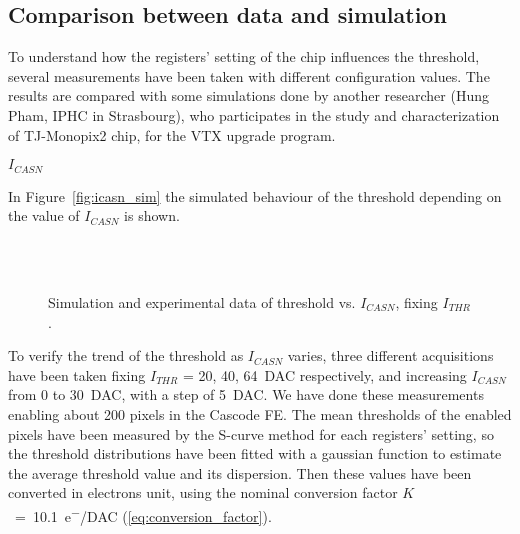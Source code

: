 \begin{comment}
\footnote{
\begin{equation}
I_{DISC} = I_{DISC, coarse} + (TCODE - 1) \cdot I_{DISC,fine},  \hspace{.5cm}	where \hspace{.5cm} 1 \leq TDAC \leq 7
\end{equation}
}
\end{comment}



\subsection{Comparison between data and simulation}

To understand how the registers' setting of the chip influences the threshold, several measurements have been taken with different configuration values.
The results are compared with some simulations done by another researcher (Hung Pham, IPHC in Strasbourg), who participates in the study and characterization of TJ-Monopix2 chip, for the VTX upgrade program.

\begin{description}
\item[\textbf{$I_{CASN}$}] 
\end{description}

In Figure~\autoref{fig:icasn_sim} the simulated behaviour of the threshold depending on the value of $I_{CASN}$ is shown.

\begin{figure}[h!]
\centering
{}\\
\\
\caption{Simulation and experimental data of threshold vs. $I_{CASN}$, fixing $I_{THR}$.}
\end{figure} 


To verify the trend of the threshold as $I_{CASN}$ varies, three different acquisitions have been taken fixing $I_{THR}$ = 20, 40, \SI{64}{DAC} respectively, and increasing $I_{CASN}$ from 0 to \SI{30}{DAC}, with a step of \SI{5}{DAC}. We have done these measurements enabling about 200 pixels in the Cascode FE. The mean thresholds of the enabled pixels have been measured by the S-curve method for each registers' setting, so the threshold distributions have been fitted with a gaussian function to estimate the average threshold value and its dispersion. Then these values have been converted in electrons unit, using the nominal conversion factor $K$~=~\SI{10.1}{e^{-}/DAC} (\autoref{eq:conversion_factor}).

